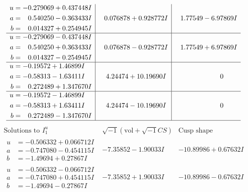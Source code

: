 \documentclass[1p]{elsarticle_modified}
\theoremstyle{definition}
\newcommand{\I}{\sqrt{-1}}
\begin{document}
$$\begin{array}{c|c|c}
\begin{aligned}
u &= -0.279069 + 0.437448 I \\
a &= \phantom{-}0.540250 - 0.363433 I \\
b &= \phantom{-}0.014327 + 0.254945 I\end{aligned}
 & \phantom{-}0.076878 + 0.928772 I & \phantom{-}1.77549 - 6.97869 I \\ \hline\begin{aligned}
u &= -0.279069 - 0.437448 I \\
a &= \phantom{-}0.540250 + 0.363433 I \\
b &= \phantom{-}0.014327 - 0.254945 I\end{aligned}
 & \phantom{-}0.076878 - 0.928772 I & \phantom{-}1.77549 + 6.97869 I \\ \hline\begin{aligned}
u &= -0.19572 + 1.46899 I \\
a &= -0.58313 - 1.63411 I \\
b &= \phantom{-}0.272489 + 1.347670 I\end{aligned}
 & \phantom{-}4.24474 + 10.19690 I & \phantom{-0.000000 } 0 \\ \hline\begin{aligned}
u &= -0.19572 - 1.46899 I \\
a &= -0.58313 + 1.63411 I \\
b &= \phantom{-}0.272489 - 1.347670 I\end{aligned}
 & \phantom{-}4.24474 - 10.19690 I & \phantom{-0.000000 } 0\\
 \hline 
 \end{array}$$\newpage$$\begin{array}{c|c|c}  
\text{Solutions to }I^u_{1}& \I (\text{vol} + \sqrt{-1}CS) & \text{Cusp shape}\\
 \hline 
\begin{aligned}
u &= -0.506332 + 0.066712 I \\
a &= -0.747080 - 0.454115 I \\
b &= -1.49694 + 0.27867 I\end{aligned}
 & -7.35852 - 1.90033 I & -10.89986 + 0.67632 I \\ \hline\begin{aligned}
u &= -0.506332 - 0.066712 I \\
a &= -0.747080 + 0.454115 I \\
b &= -1.49694 - 0.27867 I\end{aligned}
 & -7.35852 + 1.90033 I & -10.89986 - 0.67632 I \\ \hline\begin{aligned}

\end{aligned}
\end{array}$$
\end{document}
